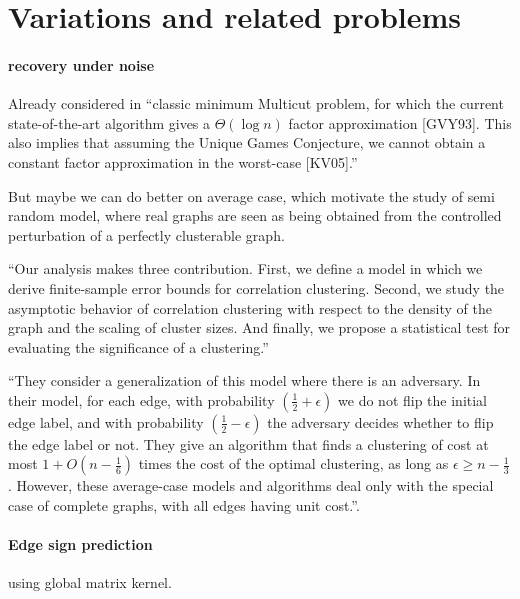 \section{Variations and related problems}
\label{sec:related}

\paragraph{recovery under noise}
Already considered in \autocite[Section 6]{Bansal2002}
\enquote{classic minimum Multicut problem, for which the current
	state-of-the-art algorithm gives a $\Theta(\log n)$ factor approximation
	[GVY93]. This also implies that assuming the Unique Games Conjecture, we
	cannot obtain a constant factor approximation in the worst-case [KV05].}\autocite{Makarychev2014}

But maybe we can do better on average case, which motivate the study of semi
random model, where real graphs are seen as being obtained from the controlled
perturbation of a perfectly clusterable graph. 

\autocite{Joachims2005} \enquote{Our analysis makes three contribution. First, we
	define a model in which we derive finite-sample error bounds for
	correlation clustering. Second, we study the asymptotic behavior of
	correlation clustering with respect to the density of the graph and the
	scaling of cluster sizes. And finally, we propose a statistical test for
	evaluating the significance of a clustering.}

\autocite{Mathieu2010}

\enquote{They consider a generalization of this model where there is an adversary. In
their model, for each edge, with probability $(\frac{1}{2} + \epsilon)$ we do
not flip the initial edge label, and with probability $(\frac{1}{2} -
\epsilon)$ the adversary decides whether to flip the edge label or not. They
give an algorithm that finds a clustering of cost at most $1 + O(n -
\frac{1}{6})$ times the cost of the optimal clustering, as long as $\epsilon
\geq n - \frac{1}{3}$ .  However, these average-case models and algorithms deal
only with the special case of complete graphs, with all edges having unit
cost.}\autocite{Makarychev2014}.


\paragraph{Edge sign prediction}
\autocite[Section 6]{Kunegis2009} using global matrix kernel.

